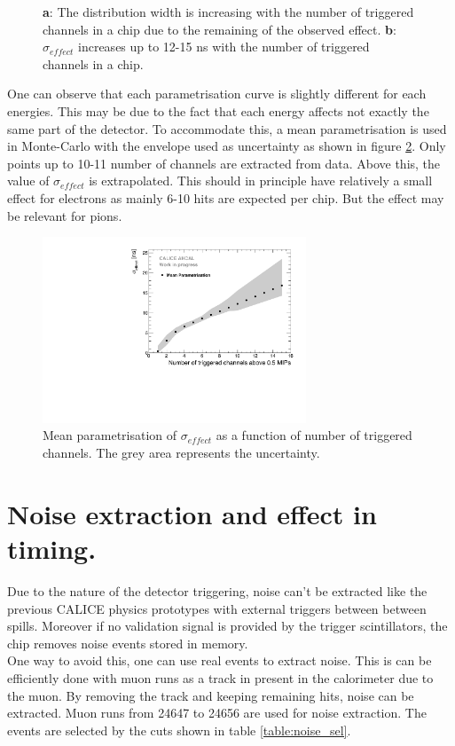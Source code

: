 \documentclass[twoside,a4paper,11pt]{article}
\begin{document}
\begin{appendix}
\begin{figure}[htbp]
	\caption[]{\textbf{a}: The distribution width is increasing with the number of triggered channels in a chip due to the remaining of the observed effect. \textbf{b}: $\sigma_{effect}$ increases up to 12-15 ns with the number of triggered channels in a chip.}
	\label{fig:mc_para}
\end{figure}
One can observe that each parametrisation curve is slightly different for each energies. This may be due to the fact that each energy affects not exactly the same part of the detector. To accommodate this, a mean parametrisation is used in Monte-Carlo with the envelope used as uncertainty as shown in figure \ref{fig:mean_para}. Only points up to 10-11 number of channels are extracted from data. Above this, the value of $\sigma_{effect}$ is extrapolated. This should in principle have relatively a small effect for electrons as mainly 6-10 hits are expected per chip. But the effect may be relevant for pions.
\begin{figure}[htbp]
\begin{center}
\includegraphics[width=0.7\textwidth]{fig/Electrons/MeanParametrisationWithSystErrors.pdf}
\caption{Mean parametrisation of $\sigma_{effect}$ as a function of number of triggered channels. The grey area represents the uncertainty.}
\label{fig:mean_para}
\end{center}
\end{figure}

\newpage
\section{Noise extraction and effect in timing.}
\label{appendix:noise}

Due to the nature of the detector triggering, noise can't be extracted like the previous CALICE physics prototypes with external triggers between between spills. Moreover if no validation signal is provided by the trigger scintillators, the chip removes noise events stored in memory.\\
One way to avoid this, one can use real events to extract noise. This is can be efficiently done with muon runs as a track in present in the calorimeter due to the muon. By removing the track and keeping remaining hits, noise can be extracted. Muon runs from 24647 to 24656 are used for noise extraction. The events are selected by the cuts shown in table \ref{table:noise_sel}.


\end{appendix}
\end{document}
